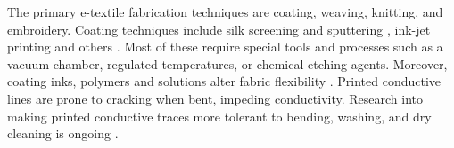 


The primary e-textile fabrication techniques are coating, weaving, knitting, and embroidery.
Coating techniques include silk screening and sputtering \cite{kim2010electrical}, ink-jet printing \cite{stempien2017shape} and others  \cite{castano2014smart}. %
Most of these require special tools and processes such as a vacuum chamber, regulated temperatures, or chemical etching agents. 
Moreover, coating inks, polymers and solutions alter fabric flexibility \cite{farboodmanesh2005effect}. 
Printed conductive lines are prone to cracking when bent, impeding conductivity. 
Research into making printed conductive traces more tolerant to bending, washing, and dry cleaning is ongoing \cite{stempien2017shape}.




